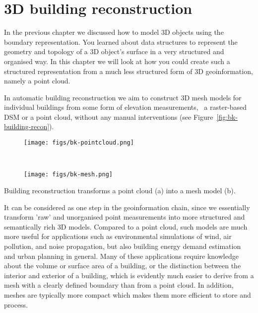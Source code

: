 
\setchapterpreamble[u]{\margintoc}

\graphicspath{{LoD2recon/}}

\chapter{3D building reconstruction}%
\label{chap:LoD2recon}

In the previous chapter we discussed how to model 3D objects using the boundary representation.
You learned about data structures to represent the geometry and topology of a 3D object's surface in a very structured and organised way.
In this chapter we will look at how you could create such a structured representation from a much less structured form of 3D geoinformation, namely a point cloud.

In automatic building reconstruction we aim to construct 3D mesh models for individual buildings from some form of elevation measurements, \ie\ a raster-based DSM or a point cloud, without any manual interventions (see Figure~\ref{fig:bk-building-recon}).
\begin{marginfigure}
	\centering
	\begin{subfigure}{\linewidth}
		\texttt{[image: figs/bk-pointcloud.png]}
		\caption{}%
		\label{subfig:bk-pc}
	\end{subfigure}
\\
	\begin{subfigure}{\linewidth}
		\texttt{[image: figs/bk-mesh.png]}
		\caption{}%
		\label{subfig:bk-mesh}
	\end{subfigure}
	\caption{Building reconstruction transforms a point cloud (a) into a mesh model (b).}%
	\label{fig:bk-building-recon}
\end{marginfigure}
It can be considered as one step in the geoinformation chain, since we essentially transform 'raw' and unorganised point measurements into more structured and semantically rich 3D models.
Compared to a point cloud, such models are much more useful for applications such as environmental simulations of wind, air pollution, and noise propagation, but also building energy demand estimation and urban planning in general.
Many of these applications require knowledge about the volume or surface area of a building, or the distinction between the interior and exterior of a building, which is evidently much easier to derive from a mesh with a clearly defined boundary than from a point cloud.
In addition, meshes are typically more compact which makes them more efficient to store and process.

